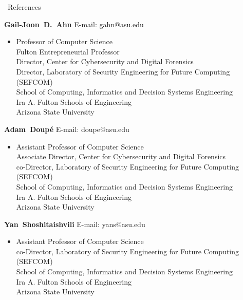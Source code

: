 \documentclass{resume} %
\newenvironment{innerlist}[1][\enskip\textbullet]%
{\begin{itemize}[#1,leftmargin=*,parsep=0pt,itemsep=0pt,topsep=0pt,partopsep=0pt]}
	{\end{itemize}}
\newcommand{\halfblankline}{\quad\vspace{-0.5\baselineskip}\pagebreak[3]}
\begin{document}

\newpage
\begin{rSection}{\faGenderless~References}
	
	\textbf{Gail-Joon~D.~Ahn} \hfill{E-mail: gahn@asu.edu}
	\begin{innerlist}
		\item[] 
		Professor of Computer Science \\
		Fulton Entrepreneurial Professor \\
		Director, Center for Cybersecurity and Digital Forensics \\
		Director, Laboratory of Security Engineering for Future Computing (SEFCOM) \\
		School of Computing, Informatics and Decision Systems Engineering \\
		Ira A. Fulton Schools of Engineering \\
		Arizona State University
	\end{innerlist}
	
	\halfblankline
	
	\textbf{Adam~Doup\'e} \hfill{E-mail: doupe@asu.edu}
	\begin{innerlist}
		\item[] 
		Assistant Professor of Computer Science \\
		Associate Director, Center for Cybersecurity and Digital Forensics \\
		co-Director, Laboratory of Security Engineering for Future Computing (SEFCOM) \\
		School of Computing, Informatics and Decision Systems Engineering \\
		Ira A. Fulton Schools of Engineering \\
		Arizona State University
	\end{innerlist}

	\halfblankline
	
	\textbf{Yan~Shoshitaishvili} \hfill{E-mail: yans@asu.edu}
	\begin{innerlist}
		\item[] 
		Assistant Professor of Computer Science \\
		co-Director, Laboratory of Security Engineering for Future Computing (SEFCOM) \\
		School of Computing, Informatics and Decision Systems Engineering \\
		Ira A. Fulton Schools of Engineering \\
		Arizona State University
	\end{innerlist}


\end{rSection}
\end{document}
